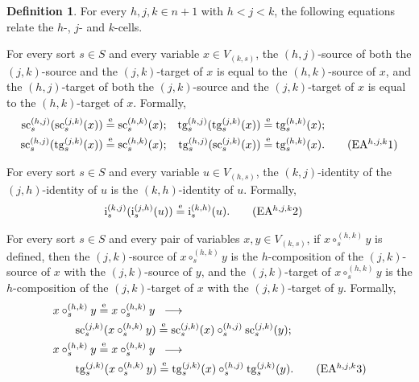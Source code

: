 \documentclass[a4paper, reqno
]{amsart}
\newcommand{\eeq}{\overset{\mathrm e}{=}}      %
\newcommand{\src}{\mathrm{sc}}
\newcommand{\tgt}{\mathrm{tg}}
\theoremstyle{plain}
\theoremstyle{definition}
\newtheorem{definition}[theorem]{Definition}
\begin{document}
\begin{definition}
For every $h,j,k\in n+1$ with $h<j<k$, the following equations relate the $h$-, $j$- and $k$-cells.

For every sort $s\in S$ and every variable $x\in V_{(k,s)}$, the $(h,j)$-source of both the $(j,k)$-source and the $(j,k)$-target of $x$ is equal to the $(h,k)$-source of $x$, and the $(h,j)$-target of both the $(j,k)$-source and the $(j,k)$-target of $x$ is equal to the $(h,k)$-target of $x$.
Formally,
\begin{align*}
\src^{(h,j)}_{s}(\src^{(j,k)}_{s}(x))&\eeq\src^{(h,k)}_{s}(x);
&
\tgt^{(h,j)}_{s}(\tgt^{(j,k)}_{s}(x))&\eeq\tgt^{(h,k)}_{s}(x);\\
\src^{(h,j)}_{s}(\tgt^{(j,k)}_{s}(x))&\eeq\src^{(h,k)}_{s}(x);
&
\tgt^{(h,j)}_{s}(\src^{(j,k)}_{s}(x))&\eeq\tgt^{(h,k)}_{s}(x).\label{AGlobularAhjk1}\tag{EA$^{h,j,k}$1}
\end{align*}

For every sort $s\in S$ and every variable $u\in V_{(h,s)}$, the $(k,j)$-identity of the $(j,h)$-identity of $u$ is the $(k,h)$-identity of $u$.
Formally,
\begin{align*}
\mathrm{i}^{(k,j)}_{s}(\mathrm{i}^{(j,h)}_{s}(u))&\eeq\mathrm{i}^{(k,h)}_{s}(u).\label{AGlobularAhjk2}\tag{EA$^{h,j,k}$2}
\end{align*}

For every sort $s\in S$ and every pair of variables $x,y\in V_{(k,s)}$, if $x\circ^{(h,k)}_{s}y$ is defined, then the $(j,k)$-source of $x\circ^{(h,k)}_{s}y$ is the $h$-composition of the $(j,k)$-source of $x$ with the $(j,k)$-source of $y$, and the $(j,k)$-target of $x\circ^{(h,k)}_{s}y$ is the $h$-composition of the $(j,k)$-target of $x$ with the $(j,k)$-target of $y$.
Formally,
\begin{align*}
&x\circ^{(h,k)}_{s}y\eeq x\circ^{(h,k)}_{s}y \;\;\longrightarrow\\
&\qquad\src^{(j,k)}_{s}(x\circ^{(h,k)}_{s}y)\eeq\src^{(j,k)}_{s}(x)\circ^{(h,j)}_{s}\src^{(j,k)}_{s}(y);\\
&x\circ^{(h,k)}_{s}y\eeq x\circ^{(h,k)}_{s}y \;\;\longrightarrow\\
&\qquad\tgt^{(j,k)}_{s}(x\circ^{(h,k)}_{s}y)\eeq\tgt^{(j,k)}_{s}(x)\circ^{(h,j)}_{s}\tgt^{(j,k)}_{s}(y).
\label{AGlobularAhjk3}\tag{EA$^{h,j,k}$3}
\end{align*}


\end{definition}
\end{document}
